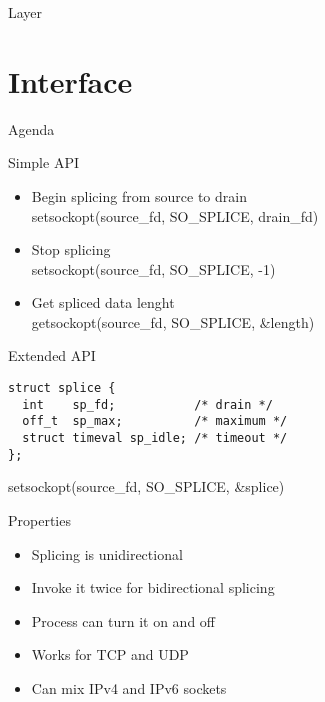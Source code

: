 \documentclass[14pt]{beamer}
\begin{document}
\begin{frame}{Layer}
\end{frame}

\section{Interface}

\begin{frame}{Agenda}
\tableofcontents[currentsection]
\end{frame}

\begin{frame}{Simple API}
\begin{itemize}
    \item Begin splicing from source to drain\\
	setsockopt(source\_fd, SO\_SPLICE, drain\_fd)
    \item Stop splicing\\
	setsockopt(source\_fd, SO\_SPLICE, -1)
    \item Get spliced data lenght\\
	getsockopt(source\_fd, SO\_SPLICE, \&length)
\end{itemize}
\end{frame}

\begin{frame}[fragile]{Extended API}
\begin{verbatim}
struct splice {
  int    sp_fd;           /* drain */
  off_t  sp_max;          /* maximum */
  struct timeval sp_idle; /* timeout */
};
\end{verbatim}
setsockopt(source\_fd, SO\_SPLICE, \&splice)
\end{frame}

\begin{frame}{Properties}
\begin{itemize}
    \item Splicing is unidirectional
    \item Invoke it twice for bidirectional splicing
    \item Process can turn it on and off
    \item Works for TCP and UDP
    \item Can mix IPv4 and IPv6 sockets
\end{itemize}
\end{frame}
\end{document}
